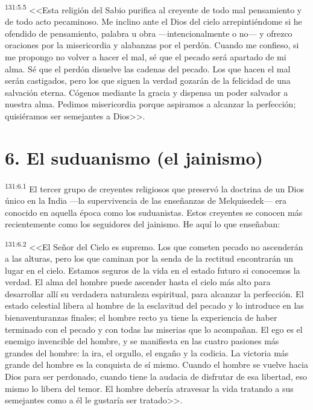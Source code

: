 \par 
\textsuperscript{131:5.5} <<Esta religión del Sabio purifica al creyente de todo mal pensamiento y de todo acto pecaminoso. Me inclino ante el Dios del cielo arrepintiéndome si he ofendido de pensamiento, palabra u obra ---intencionalmente o no--- y ofrezco oraciones por la misericordia y alabanzas por el perdón. Cuando me confieso, si me propongo no volver a hacer el mal, sé que el pecado será apartado de mi alma. Sé que el perdón disuelve las cadenas del pecado. Los que hacen el mal serán castigados, pero los que siguen la verdad gozarán de la felicidad de una salvación eterna. Cógenos mediante la gracia y dispensa un poder salvador a nuestra alma. Pedimos misericordia porque aspiramos a alcanzar la perfección; quisiéramos ser semejantes a Dios>>.

\section*{6. El suduanismo (el jainismo)}
\par 
\textsuperscript{131:6.1} El tercer grupo de creyentes religiosos que preservó la doctrina de un Dios único en la India ---la supervivencia de las enseñanzas de Melquisedek--- era conocido en aquella época como los suduanistas. Estos creyentes se conocen más recientemente como los seguidores del jainismo. He aquí lo que enseñaban:

\par 
\textsuperscript{131:6.2} <<El Señor del Cielo es supremo. Los que cometen pecado no ascenderán a las alturas, pero los que caminan por la senda de la rectitud encontrarán un lugar en el cielo. Estamos seguros de la vida en el estado futuro si conocemos la verdad. El alma del hombre puede ascender hasta el cielo más alto para desarrollar allí su verdadera naturaleza espiritual, para alcanzar la perfección. El estado celestial libera al hombre de la esclavitud del pecado y lo introduce en las bienaventuranzas finales; el hombre recto ya tiene la experiencia de haber terminado con el pecado y con todas las miserias que lo acompañan. El ego es el enemigo invencible del hombre, y se manifiesta en las cuatro pasiones más grandes del hombre: la ira, el orgullo, el engaño y la codicia. La victoria más grande del hombre es la conquista de sí mismo. Cuando el hombre se vuelve hacia Dios para ser perdonado, cuando tiene la audacia de disfrutar de esa libertad, eso mismo lo libera del temor. El hombre debería atravesar la vida tratando a sus semejantes como a él le gustaría ser tratado>>.

